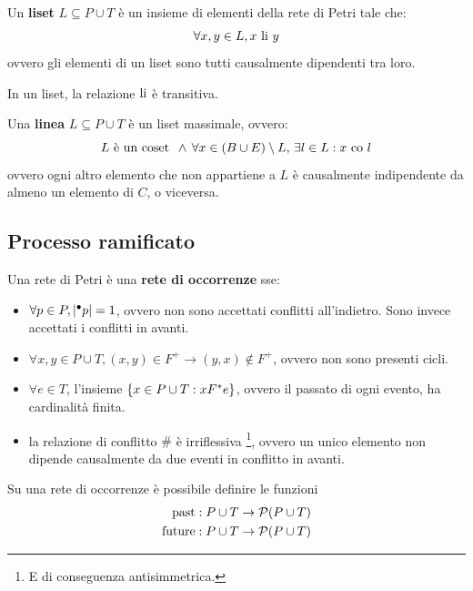 \begin{defn}
    Un \textbf{liset} $L \subseteq P \cup T$ è un insieme di elementi della
    rete di Petri tale che:
    \[
        \forall x, y \in L, x \textnormal{ li } y
    \]
    ovvero gli elementi di un liset sono tutti causalmente dipendenti tra loro.
\end{defn}

\begin{rem}
    In un liset, la relazione $\textnormal{li}$ è transitiva.
\end{rem}

\begin{defn}
    Una \textbf{linea} $L \subseteq P \cup T$ è un liset massimale, ovvero:
    \[
        L \textnormal{ è un coset } \, \land \, \forall x \in (B \cup E) \setminus L, \,
        \exists l \in L : x \textnormal{ co } l
    \]
    ovvero ogni altro elemento che non appartiene a $L$ è causalmente
    indipendente da almeno un elemento di $C$, o viceversa.
\end{defn}

\subsection*{Processo ramificato}
\begin{defn}
    Una rete di Petri è una \textbf{rete di occorrenze} sse:
    \begin{itemize}
        \item $\forall p \in P, |{^\bullet}p| = 1$, ovvero non sono
        accettati conflitti all'indietro. Sono invece accettati
        i conflitti in avanti.
        \item $\forall x, y \in P \cup T, (x,y) \in F^+ \rightarrow
        (y,x) \notin F^+$, ovvero non sono presenti cicli.
        \item $\forall e \in T$, l'insieme $\left\{x \in P \cup T : x F^*e\right\}$,
        ovvero il passato di ogni evento, ha cardinalità finita.
        \item la relazione di conflitto $\#$ è irriflessiva \footnote{E di
        conseguenza antisimmetrica.}, ovvero un unico elemento non dipende
        causalmente da due eventi in conflitto in avanti.
    \end{itemize}
\end{defn}

Su una rete di occorrenze è possibile definire le funzioni
\begin{align*}
    \textnormal{past}: P \cup T &\rightarrow \mathcal{P}(P \cup T)\\
    \textnormal{future}: P \cup T &\rightarrow \mathcal{P}(P \cup T)
\end{align*}

